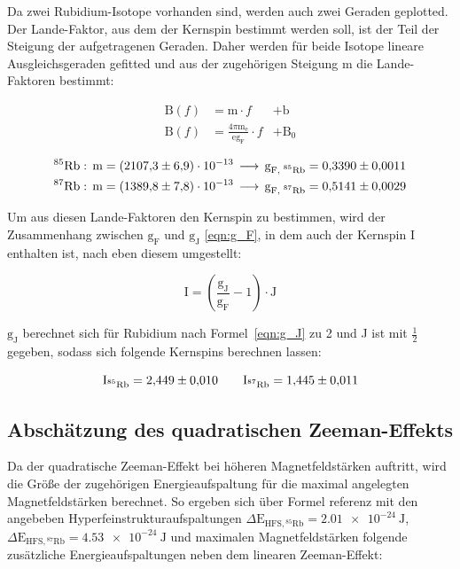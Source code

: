         \noindent
        
        
        
        Da zwei Rubidium-Isotope vorhanden sind, werden auch zwei Geraden geplotted. Der Lande-Faktor, aus dem der Kernspin bestimmt werden soll, ist der Teil der Steigung der aufgetragenen Geraden. Daher 
        werden für beide Isotope lineare Ausgleichsgeraden gefitted und aus der zugehörigen Steigung m die Lande-Faktoren bestimmt:

        \begin{align*}
            \text{B}(f) &= \text{m} \cdot f &+ \text{b}   \\
            \text{B}(f) &= \frac{4 \pi \text{m}_{\text{e}}}{\text{e} \text{g}_{\text{F}}} \cdot f &+ \text{B}_0 
        \end{align*}

        \begin{align*}
            \text{${}^{85}$Rb} &: \, \text{m} = \num{2107.3\pm6.9 e-13} \, \longrightarrow \, \text{g}_{\text{F, ${}^{85}$Rb}} = \num{0.3390 +- 0.0011} \\
            \text{${}^{87}$Rb} &: \, \text{m} = \num{1389.8\pm7.8 e-13} \, \longrightarrow \, \text{g}_{\text{F, ${}^{87}$Rb}} = \num{0.5141 +- 0.0029} 
        \end{align*}

        \noindent

        Um aus diesen Lande-Faktoren den Kernspin zu bestimmen, wird der Zusammenhang zwischen $\text{g}_{\text{F}}$ und $\text{g}_{\text{J}}$ \ref{eqn:g_F}, in dem auch der Kernspin I enthalten ist, nach 
        eben diesem umgestellt:
        
        \begin{equation*}
            \text{I} = \left( \frac{\text{g}_{\text{J}}}{\text{g}_{\text{F}}} - 1 \right) \cdot \text{J}
        \end{equation*}

        $\text{g}_{\text{J}}$ berechnet sich für Rubidium nach Formel~\ref{eqn:g_J} zu 2 und J ist mit $\frac{1}{2}$ gegeben, sodass sich folgende Kernspins berechnen lassen:

        \begin{equation*}
            \text{I}_{\text{${}^{85}$Rb}} = \num{2.449 +- 0.010} \qquad \text{I}_{\text{${}^{87}$Rb}} = \num{1.445 +- 0.011}
        \end{equation*}

        

    \subsection{Abschätzung des quadratischen Zeeman-Effekts}
        Da der quadratische Zeeman-Effekt bei höheren Magnetfeldstärken auftritt, wird die Größe der zugehörigen Energieaufspaltung für die maximal angelegten Magnetfeldstärken berechnet. So ergeben sich über
        Formel referenz mit den angebeben Hyperfeinstrukturaufspaltungen 
        $\Delta\text{E}_{\text{HFS}, {}^{85}\text{Rb}} =  \SI{2.01 e-24}{\joule}$, $\Delta\text{E}_{\text{HFS}, {}^{87}\text{Rb}} = \SI{4.53 e-24}{\joule}$ und maximalen Magnetfeldstärken folgende 
        zusätzliche Energieaufspaltungen neben dem linearen Zeeman-Effekt:

